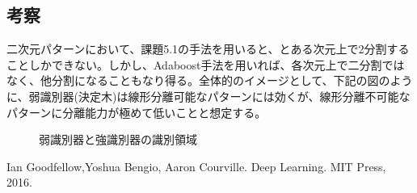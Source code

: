 \documentclass[ %
  uplatex,%
  papersize%
]{jsarticle}
\begin{document}
\subsection{考察}
二次元パターンにおいて、課題5.1の手法を用いると、とある次元上で2分割することしかできない。しかし、Adaboost手法を用いれば、各次元上で二分割ではなく、他分割になることもなり得る。全体的のイメージとして、下記の図のように、弱識別器(決定木)は線形分離可能なパターンには効くが、線形分離不可能なパターンに分離能力が極めて低いことと想定する。


\begin{figure}[!h]
\centering
{}
\caption{弱識別器と強識別器の識別領域} 
\end{figure}



\begin{thebibliography}{9}
     Ian Goodfellow,Yoshua Bengio, Aaron Courville. Deep Learning. MIT Press, 2016.
\end{thebibliography}
\end{document}
